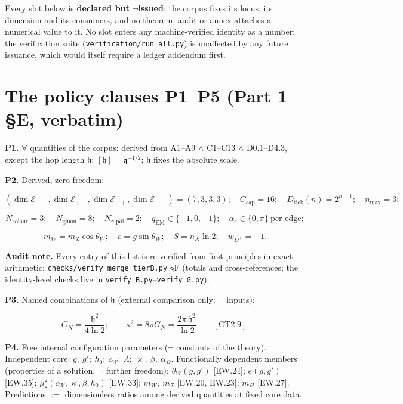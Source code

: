 \documentclass[11pt,openany]{report}
\theoremstyle{canonplain}
\theoremstyle{canondef}
\begin{document}
Every slot below is \textbf{declared but $\neg$issued}: the corpus fixes its
locus, its dimension and its consumers, and no theorem, audit or annex attaches
a numerical value to it. No slot enters any machine-verified identity as a
number; the verification suite (\texttt{verification/run\_all.py}) is unaffected
by any future issuance, which would itself require a ledger addendum first.

\section*{\texorpdfstring{The policy clauses P1--P5 (Part 1 §E, verbatim)}{The policy clauses P1-P5}}
\label{tag:P1}
\textbf{P1.} $\forall$ quantities of the corpus: derived from A1–A9 $\wedge$ C1–C13 $\wedge$ D0.1–D4.3, except the hop length $\mathfrak h$; $[\mathfrak h]=\mathfrak q^{-1/2}$; $\mathfrak h$ fixes the absolute scale.

\label{tag:P2}
\textbf{P2.} Derived, zero freedom:

\[
(\dim\mathcal E_{++},\dim\mathcal E_{+-},\dim\mathcal E_{-+},\dim\mathcal E_{--})=(7,3,3,3);\quad
C_{\mathrm{cap}}=16;\quad
D_{\mathrm{tick}}(n)=2^{n+1};\quad
n_{\max}=3;
\]

\[
N_{\text{colour}}=3;\quad
N_{\text{gluon}}=8;\quad
N_{\gamma\text{-pol}}=2;\quad
q_{\mathrm{EM}}\in\{-1,0,+1\};\quad
\alpha_e\in\{0,\pi\}\ \text{per edge};
\]

\[
m_W=m_Z\cos\theta_W;\quad
e=g\sin\theta_W;\quad
S=n_{\mathcal R}\ln2;\quad
w_{D^+}=-1 .
\]

\textbf{Audit note.} Every entry of this list is re-verified from first principles in exact arithmetic: \texttt{checks/\allowbreak{}verify\_\allowbreak{}merge\_\allowbreak{}tierB.py} §F (totals and cross-references; the identity-level checks live in \texttt{verify\_\allowbreak{}B.py}–\texttt{verify\_\allowbreak{}G.py}).

\label{tag:P3}
\textbf{P3.} Named combinations of $\mathfrak h$ (external comparison only; $\neg$ inputs):

\[
G_N=\frac{\mathfrak h^2}{4\ln2};\qquad
\kappa^2=8\pi G_N=\frac{2\pi\,\mathfrak h^2}{\ln2}\qquad[\mathrm{CT2.9}].
\]

\label{tag:P4}
\textbf{P4.} Free internal configuration parameters ($\neg$ constants of the theory). Independent core: $g,\ g';\ h_0;\ c_W;\ \Lambda;\ \varkappa,\ \beta,\ \alpha_\Omega$. Functionally dependent members (properties of a solution, $\neg$ further freedom): $\theta_W(g,g')$ [EW.24]; $e(g,g')$ [EW.35]; $\mu_\star^2(c_W,\varkappa,\beta,h_0)$ [EW.33]; $m_W,\ m_Z$ [EW.20, EW.23]; $m_H$ [EW.27]. Predictions $:=$ dimensionless ratios among derived quantities at fixed core data.
\end{document}
